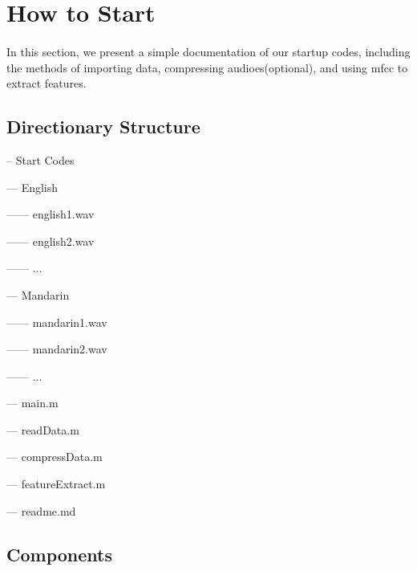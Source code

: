 \newpage



\section{How to Start}
\paragraph{}
In this section, we present a simple documentation of our startup codes, including the methods of importing data, compressing audioes(optional), and using mfcc to extract features. 

\subsection{Directionary Structure}
-- Start Codes

	--- English
	
	------ english1.wav
		
	------ english2.wav
		
	------ ...
		
	--- Mandarin
	
	------ mandarin1.wav
		
	------ mandarin2.wav
		
	------ ...
		
	--- main.m
	
	--- readData.m
	
	--- compressData.m
	
	--- featureExtract.m
	
	--- readme.md

\subsection{Components}


